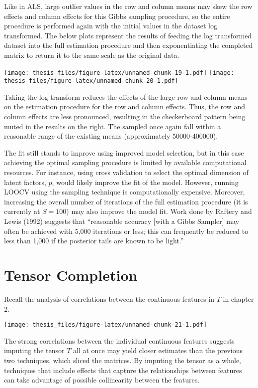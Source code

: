 \documentclass[12pt,twoside]{dukestatscithesis}
\theoremstyle{definition}
\theoremstyle{definition}
\theoremstyle{definition}
\theoremstyle{remark}
\begin{document}
Like in ALS, large outlier values in the row and column means may skew
the row effects and column effects for this Gibbs sampling procedure, so
the entire procedure is performed again with the initial values in the
dataset log transformed. The below plots represent the results of
feeding the log transformed dataset into the full estimation procedure
and then exponentiating the completed matrix to return it to the same
scale as the original data.

\texttt{[image: thesis\_files/figure-latex/unnamed-chunk-19-1.pdf]}
\texttt{[image: thesis\_files/figure-latex/unnamed-chunk-20-1.pdf]}

Taking the log transform reduces the effects of the large row and column
means on the estimation procedure for the row and column effects. Thus,
the row and column effects are less pronounced, resulting in the
checkerboard pattern being muted in the results on the right. The
sampled once again fall within a reasonable range of the existing means
(approximately 50000-400000).

The fit still stands to improve using improved model selection, but in
this case achieving the optimal sampling procedure is limited by
available computational resources. For instance, using cross validation
to select the optimal dimension of latent factors, \(p\), would likely
improve the fit of the model. However, running LOOCV using the sampling
technique is computationally expensive. Moreover, increasing the overall
number of iterations of the full estimation procedure (it is currently
at \(S = 100\)) may also improve the model fit. Work done by Raftery and
Lewis (1992) suggests that ``reasonable accuracy {[}with a Gibbs
Sampler{]} may often be achieved with 5,000 iterations or less; this can
frequently be reduced to less than 1,000 if the posterior tails are
known to be light.''

\chapter{Tensor Completion}\label{tensor-completion}

Recall the analysis of correlations between the continuous features in
\(T\) in chapter 2.

\texttt{[image: thesis\_files/figure-latex/unnamed-chunk-21-1.pdf]}

The strong correlations between the individual continuous features
suggests imputing the tensor \(T\) all at once may yield closer
estimates than the previous two techniques, which sliced the matrices.
By imputing the tensor as a whole, techniques that include effects that
capture the relationships between features can take advantage of
possible collinearity between the features.
\end{document}
